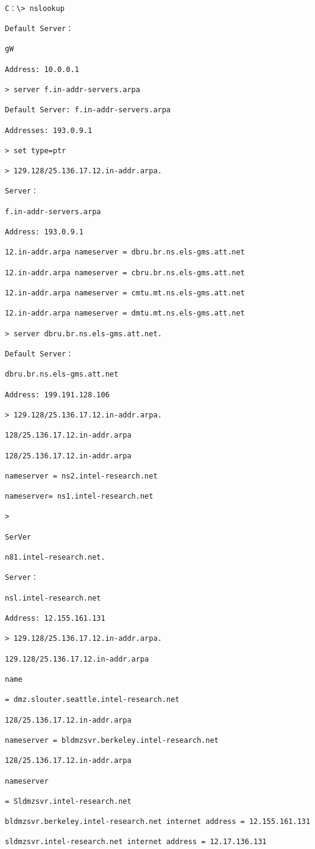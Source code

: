\begin{verbatim}
    
C：\> nslookup

Default Server：

gW

Address: 10.0.0.1

> server f.in-addr-servers.arpa

Default Server: f.in-addr-servers.arpa

Addresses: 193.0.9.1

> set type=ptr

> 129.128/25.136.17.12.in-addr.arpa.

Server：

f.in-addr-servers.arpa

Address: 193.0.9.1

12.in-addr.arpa nameserver = dbru.br.ns.els-gms.att.net

12.in-addr.arpa nameserver = cbru.br.ns.els-gms.att.net

12.in-addr.arpa nameserver = cmtu.mt.ns.els-gms.att.net

12.in-addr.arpa nameserver = dmtu.mt.ns.els-gms.att.net

> server dbru.br.ns.els-gms.att.net.

Default Server：

dbru.br.ns.els-gms.att.net

Address: 199.191.128.106

> 129.128/25.136.17.12.in-addr.arpa.

128/25.136.17.12.in-addr.arpa

128/25.136.17.12.in-addr.arpa

nameserver = ns2.intel-research.net

nameserver= ns1.intel-research.net

>

SerVer

n81.intel-research.net.

Server：

nsl.intel-research.net

Address: 12.155.161.131

> 129.128/25.136.17.12.in-addr.arpa.

129.128/25.136.17.12.in-addr.arpa

name

= dmz.slouter.seattle.intel-research.net

128/25.136.17.12.in-addr.arpa

nameserver = bldmzsvr.berkeley.intel-research.net

128/25.136.17.12.in-addr.arpa

nameserver

= Sldmzsvr.intel-research.net

bldmzsvr.berkeley.intel-research.net internet address = 12.155.161.131

sldmzsvr.intel-research.net internet address = 12.17.136.131
\end{verbatim}

